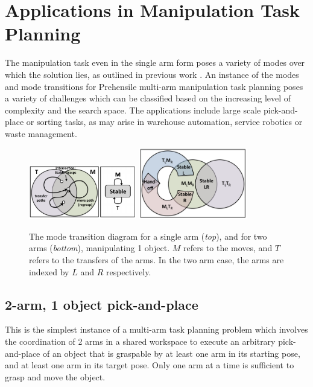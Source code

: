 \section{Applications in Manipulation Task Planning}
The manipulation task even in the single arm form poses a variety of modes over which the solution lies, as outlined in previous work \cite{dobson2015planning}. An instance of the modes and mode transitions for 
Prehensile multi-arm manipulation task planning poses a variety of challenges which can be classified based on the increasing level of complexity and the search space. The applications include large scale pick-and-place or sorting tasks, as may arise in warehouse automation, service robotics or waste management. 

\begin{figure}[h]
\centering
\includegraphics[width=0.42\textwidth]{figures/single_arm}
\includegraphics[width=0.42\textwidth]{figures/dual_arm}
\caption{The mode transition diagram for a single arm (\textit{top}), and for two arms (\textit{bottom}), manipulating 1 object. $M$ refers to the moves, and $T$ refers to the transfers of the arms. In the two arm case, the arms are indexed by $L$ and $R$ respectively.
}
\label{fig:single_dual_modes}
\end{figure}

\subsection{2-arm, 1 object pick-and-place}
This is the simplest instance of a multi-arm task planning problem which involves the coordination of 2 arms in a shared workspace to execute an arbitrary pick-and-place of an object that is graspable by at least one arm in its starting pose, and at least one arm in its target pose. Only one arm at a time is sufficient to grasp and move the object.

